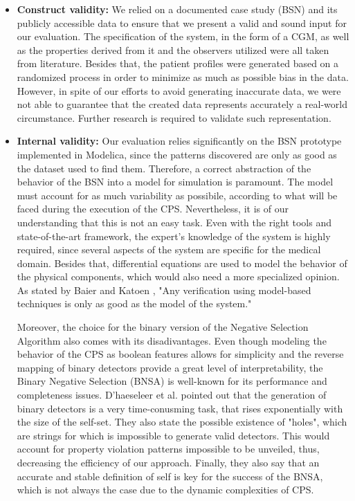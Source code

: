 \begin{itemize}
    \item \textbf{Construct validity:} We relied on a documented case study  (BSN) and its publicly accessible data to ensure that we present a valid and sound input for our evaluation. The specification of the system, in the form of a CGM, as well as the properties derived from it and the observers utilized were all taken from literature. Besides that, the patient profiles were generated based on a randomized process in order to minimize as much as possible bias in the data. However, in spite of our efforts to avoid generating inaccurate data, we were not able to guarantee that the created data represents accurately a real-world circumstance. Further research is required to validate such representation.
    
    \item \textbf{Internal validity:} Our evaluation relies significantly on the BSN prototype implemented in Modelica, since the patterns discovered are only as good as the dataset used to find them. Therefore, a correct abstraction of the behavior of the BSN into a model for simulation is paramount. The model must account for as much variability as possibile, according to what will be faced during the execution of the CPS. Nevertheless, it is of our understanding that this is not an easy task. Even with the right tools and state-of-the-art framework, the expert's knowledge of the system is highly required, since several aspects of the system are specific for the medical domain. Besides that, differential equations are used to model the behavior of the physical components, which would also need a more specialized opinion. As stated by Baier and Katoen \cite{2008PrinciplesModelChecking}, "Any verification using model-based techniques is only as good as the model of the system."
    
    Moreover, the choice for the binary version of the Negative Selection Algorithm also comes with its disadivantages. Even though modeling the behavior of the CPS as boolean features allows for simplicity and the reverse mapping of binary detectors provide a great level of interpretability, the Binary Negative Selection (BNSA) is well-known for its performance and completeness issues. D'haeseleer et al. \cite{NSADetGen1996} pointed out that the generation of binary detectors is a very time-conusming task, that rises exponentially with the size of the self-set. They also state the possible existence of "holes", which are strings for which is impossible to generate valid detectors. This would account for property violation patterns impossible to be unveiled, thus, decreasing the efficiency of our approach. Finally, they also say that an accurate and stable definition of self is key for the success of the BNSA, which is not always the case due to the dynamic complexities of CPS.
	

\end{itemize}
